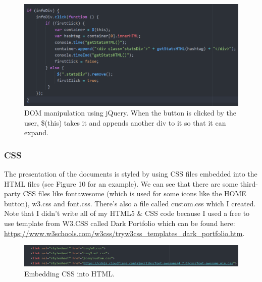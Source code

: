 \documentclass[12pt]{article} %
\begin{document}
	\begin{figure}[H] %
	\includegraphics[width=1\linewidth]{images/htmlAPI}
	\caption{DOM manipulation using jQuery. When the button is clicked by the user, \$(this) takes it and appends another div to it so that it can expand.}
	\label{htmlAPI}
	\end{figure}

  \subsubsection{CSS \cite{css}} The presentation of the documents is styled by using CSS files embedded into the HTML files (see Figure 10 for an example).
	We can see that there are some third-party CSS files like fontawesome (which is used for some icons like the HOME button), w3.css and font.css. There's also a file called custom.css which I created.
 	Note that I didn't write all of my HTML5 \& CSS code because I used a free to use template from W3.CSS called Dark Portfolio which can be found here: 
	\url{https://www.w3schools.com/w3css/tryw3css_templates_dark_portfolio.htm}.

	\begin{figure}[H] %
	\includegraphics[width=1\linewidth]{images/embeddedCSS}
	\caption{Embedding CSS into HTML.}
	\label{embeddedCSS}
	\end{figure}
\end{document}
